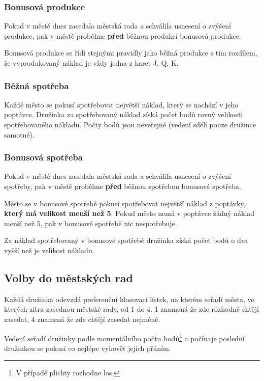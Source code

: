 \documentclass[a4paper, 12pt, twoside]{article}
\begin{document}
\subsubsection{Bonusová produkce}

Pokud v městě dnes zasedala městská rada a schválila usnesení o zvýšení produkce, pak v městě proběhne \textbf{před} běžnou produkcí bonusová produkce.

Bonusová produkce se řídí stejnými pravidly jako běžná produkce s tím rozdílem, že vyprodukovaný náklad je vždy jedna z karet J, Q, K.

\subsubsection{Běžná spotřeba}

Každé město se pokusí spotřebovat největší náklad, který se nachází v jeho poptávce.  Družinka za spotřebovaný náklad získá počet bodů rovný velikosti
spotřebovaného nákladu.  Počty bodů jsou neveřejné (vedení sdělí pouze družince samotné).

\subsubsection{Bonusová spotřeba}

Pokud v městě dnes zasedala městská rada a schválila usnesení o zvýšení spotřeby, pak v městě proběhne \textbf{před} běžnou spotřebou bonusová spotřeba.

Město se v bonusové spotřebě pokusí spotřebovat největší náklad z poptávky, \textbf{který má velikost menší než 5}.  Pokud město nemá v poptávce
žádný náklad menší než 5, pak v bonusové spotřebě nic nespotřebuje.

Za náklad spotřebovaný v bonusové spotřebě družinka získá počet bodů o dva vyšší než je velikost nákladu.


\subsection{Volby do městských rad}
\label{volby}

Každá družinka odevzdá preferenční hlasovací lístek, na kterém seřadí města, ve kterých zítra zasednou městské rady, od 1 do 4.  1 znamená že 
zde rozhodně chtějí zasedat, 4 znamená že zde chtějí zasedat nejméně.

Vedení seřadí družinky podle momentálního počtu bodů\footnote{V případě plichty rozhodne los.} a počínaje poslední družinkou se pokusí co nejlépe vyhovět jejich přáním.
\end{document}

